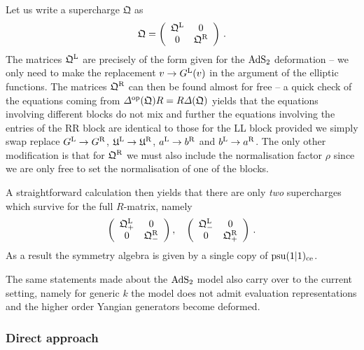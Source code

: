\documentclass[12pt,a4paper]{article}
\numberwithin{equation}{section}
\newcommand{\kQ}{\mathfrak{Q}}
\newcommand{\kU}{\mathfrak{U}}
\begin{document}
Let us write a supercharge $\kQ$ as 
\begin{equation}
\kQ = \left(
\begin{array}{cc}
\kQ^{\rm L} & 0 \\
0 & \kQ^{\rm R}
\end{array}
\right)\,.
\end{equation}
The matrices $\kQ^{\rm L}$ are precisely of the form given for the ${\rm AdS}_2$ deformation -- we only need to make the replacement $v\rightarrow G^{\rm L}(v)$ in the argument of the elliptic functions. The matrices $\kQ^{\rm R}$ can then be found almost for free -- a quick check of the equations coming from $\Delta^{\rm op}(\kQ)R = R\Delta(\kQ)$ yields that the equations involving different blocks do not mix and further the equations involving the entries of the RR block are identical to those for the LL block provided we simply swap replace $G^{\rm L} \rightarrow G^{\rm R}$, $\kU^{\rm L}\rightarrow \kU^{\rm R}$, $a^{\rm L} \rightarrow b^{\rm R}$ and $b^{\rm L}\rightarrow a^{\rm R}$. The only other modification is that for $\kQ^{\rm R}$ we must also include the normalisation factor $\rho$ since we are only free to set the normalisation of one of the blocks. 


A straightforward calculation then yields that there are only \textit{two} supercharges which survive for the full $R$-matrix, namely 
\begin{equation}
\left(
\begin{array}{cc}
\kQ^{\rm L}_+ & 0 \\
0 & \kQ^{\rm R}_-
\end{array}
\right),\quad \left(
\begin{array}{cc}
\kQ^{\rm L}_- & 0 \\
0 & \kQ^{\rm R}_+
\end{array}
\right)\,.
\end{equation}
%
As a result the symmetry algebra is given by a single copy of ${\rm psu}(1|1)_{\rm ce}$. 

The same statements made about the ${\rm AdS}_2$ model also carry over to the current setting, namely for generic $k$ the model does not admit evaluation representations and the higher order Yangian generators become deformed. 

\iffalse
\subsubsection*{Direct approach}
\end{document}
